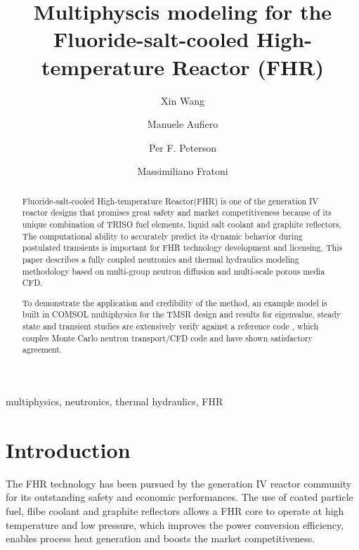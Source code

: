\documentclass{elsarticle}
\begin{document}
\begin{frontmatter}

\title{Multiphyscis modeling for the Fluoride-salt-cooled High-temperature Reactor (FHR)}
 
\author[ucb]{Xin Wang } 
\author{Manuele Aufiero}
\author{Per F. Peterson}
\author{Massimiliano Fratoni}
\address[ucb]{University of California, Berkeley, Department of Nuclear Engineering, Berkeley, CA 94720-1730 USA}


\begin{abstract}
Fluoride-salt-cooled High-temperature Reactor(FHR) is one of the generation IV reactor designs that promises great safety and market competitiveness because of its unique combination of TRISO fuel elements, liquid salt coolant and graphite reflectors.
 The computational ability to accurately predict its dynamic behavior during postulated transients is important for FHR technology development and licensing. This paper describes a fully coupled neutronics and thermal hydraulics modeling methodology based on multi-group neutron diffusion and multi-scale porous media CFD.
 
 To demonstrate the application and credibility of the method, an example model is built in COMSOL multiphysics for the TMSR design and results for eigenvalue, steady state and transient studies are extensively verify against a reference code , which couples Monte Carlo neutron transport/CFD code and have shown satisfactory agreement.
\end{abstract}

\begin{keyword}
  multiphysics, neutronics, thermal hydraulics, FHR
\end{keyword}

\end{frontmatter}


\section{Introduction}
\label{sec:introduction}
The FHR technology has been pursued by the generation IV reactor community for its outstanding safety and economic performances. The use of coated particle fuel, flibe coolant and graphite reflectors allows a FHR core to operate at high temperature and low pressure, which improves the power conversion efficiency, enables process heat generation and boosts the market competitiveness. 
\end{document}
